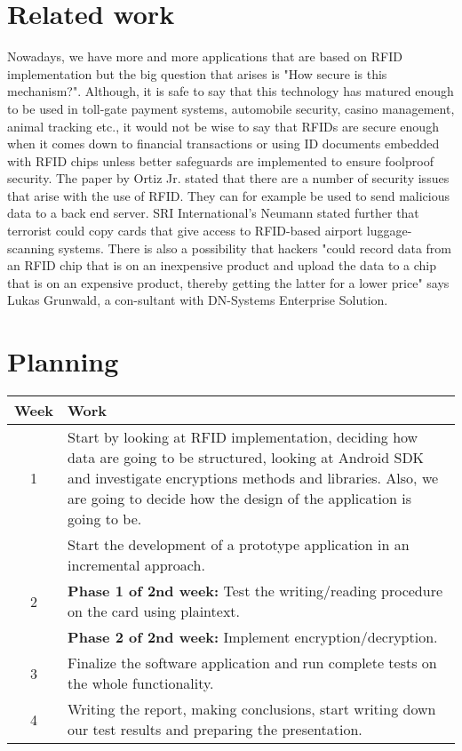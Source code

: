 \documentclass[11pt]{article}
\begin{document}
\section{Related work}
Nowadays, we have more and more applications that are based on RFID implementation but the big question that arises is "How secure is this mechanism?". Although, it is safe to say that this technology has matured enough to be used in toll-gate payment systems, automobile security, casino management, animal tracking etc., it would not be wise to say that RFIDs are secure enough when it comes down to financial transactions or using ID documents embedded with RFID chips unless better safeguards are implemented to ensure foolproof security. \cite{grover2011survey}
\newline
\newline
The paper by Ortiz Jr. stated that there are a number of security issues that arise with the use of RFID. They can for example be used to send malicious data to a back end server. SRI International’s Neumann stated further that terrorist could copy cards that give access to RFID-based airport luggage-scanning systems. There is also a possibility that hackers "could record data from an RFID chip that is on an inexpensive product and upload the data to a chip that is on an expensive product, thereby getting the latter for a lower price" says Lukas Grunwald, a con-sultant with DN-Systems Enterprise Solution. \cite{ortiz2006secure}

\section{Planning}

\begin{center}
\begin{tabular}{ | c | m{11cm}|  } 
\hline
Week & Work \\ 
\hline
1 & Start by looking at RFID implementation, deciding how data are going to be structured, looking at Android SDK and investigate encryptions methods and libraries. Also, we are going to decide how the design of the application is going to be. \\ 
\hline
& Start the development of a prototype application in an incremental approach.\\
2 & \textbf{Phase 1 of 2nd week:} Test the writing/reading procedure on the card using plaintext.\\
& \textbf{Phase 2 of 2nd week:} Implement encryption/decryption.\\ 
\hline
3 & Finalize the software application and run complete tests on the whole functionality.\\ 
\hline
4 & Writing the report, making conclusions, start writing down our test results and preparing the presentation. \\
\hline
\end{tabular}
\end{center}
\end{document}
